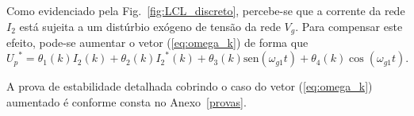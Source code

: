     Como evidenciado pela Fig.~\ref{fig:LCL_discreto}, percebe-se que a corrente da rede $I_2$ está sujeita a um distúrbio exógeno de tensão da rede $V_g$. Para compensar este efeito, pode-se aumentar o vetor (\ref{eq:omega_k}) de forma que
    \begin{equation}
        {U_p}^* = \theta_1(k) I_2(k) + \theta_2(k) {I_2}^*(k)+
            \theta_3(k) \text{sen}(\omega_{g1}t) + \theta_4(k) \cos(\omega_{g1} t) \text{.}
    \end{equation}

    A prova de estabilidade detalhada cobrindo o caso do vetor (\ref{eq:omega_k}) aumentado é conforme consta no Anexo~\ref{provas}.



